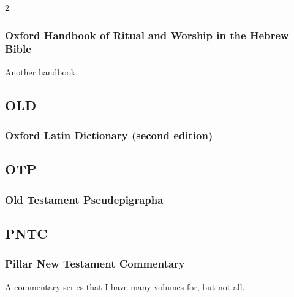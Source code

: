 \begin{multicols}{2}
		\subsubsection*{Oxford Handbook of Ritual and Worship in the Hebrew Bible}
		
			Another handbook.
			
	\subsection*{OLD}
	
		\subsubsection*{Oxford Latin Dictionary (second edition)}
		
			\phantom{.}
			
	\subsection*{OTP}
	
		\subsubsection*{Old Testament Pseudepigrapha}
		
			\phantom{.}
				
	\subsection*{PNTC}
	
		\subsubsection*{Pillar New Testament Commentary}
		
			A commentary series that I have many volumes for, but not all.
			

\end{multicols}
